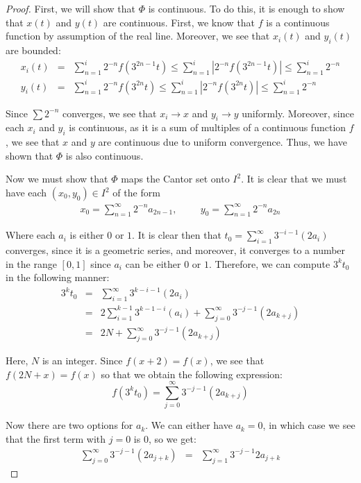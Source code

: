 \documentclass[psamsfonts]{amsart}
\theoremstyle{definition}
\theoremstyle{remark}
\numberwithin{equation}{section}
\begin{document}
\begin{proof}
First, we will show that $\Phi$ is continuous. To do this, it is enough to show that $x(t)$ and $y(t)$ are continuous. First, we know that $f$ is a continuous function by assumption of the real line. Moreover, we see that $x_i(t)$ and $y_i(t)$ are bounded:
\begin{eqnarray}
x_i(t) &=& \sum_{n=1}^i 2^{-n} f(3^{2n-1}t) \leq \sum_{n=1}^i |2^{-n} f(3^{2n-1}t)| \leq \sum_{n=1}^i 2^{-n} \\
y_i(t) &=& \sum_{n=1}^i 2^{-n} f(3^{2n}t) \leq \sum_{n=1}^i |2^{-n} f(3^{2n}t)| \leq \sum_{n=1}^i 2^{-n} 
\end{eqnarray}

Since $\sum 2^{-n}$ converges, we see that $x_i \to x$ and $y_i \to y$ uniformly. Moreover, since each $x_i$ and $y_i$ is continuous, as it is a sum of multiples of a continuous function $f$, we see that $x$ and $y$ are continuous due to uniform convergence. Thus, we have shown that $\Phi$ is also continuous.

Now we must show that $\Phi$ maps the Cantor set onto $I^2$. It is clear that we must have each $(x_0, y_0) \in I^2$ of the form 
\begin{eqnarray}
x_0 = \sum_{n=1}^\infty 2^{-n} a_{2n-1}, \hspace{1cm} y_0 = \sum_{n=1}^\infty 2^{-n} a_{2n}
\end{eqnarray}

Where each $a_i$ is either $0$ or $1$. It is clear then that $t_0 = \sum_{i=1}^\infty 3^{-i -1}(2 a_i)$ converges, since it is a geometric series, and moreover, it converges to a number in the range $[0,1]$ since $a_i$ can be either $0$ or $1$. Therefore, we can compute $3^k t_0$ in the following manner:
\begin{eqnarray}
3^k t_0 &=& \sum_{i=1}^\infty 3^{k-i-1} (2a_i) \\
&=& 2 \sum_{i=1}^{k-1} 3^{k-1 - i} (a_i) + \sum_{j=0}^\infty 3^{-j-1} (2 a_{k+j}) \\
&=& 2 N + \sum_{j=0}^\infty 3^{-j-1} (2 a_{k+j})
\end{eqnarray}

Here, $N$ is an integer. Since $f(x+2) = f(x)$, we see that $f(2N + x) = f(x)$ so that we obtain the following expression:
\begin{equation}
f(3^k t_0) = \sum_{j=0}^\infty 3^{-j-1} (2 a_{k+j})
\end{equation}

Now there are two options for $a_k$. We can either have $a_k = 0$, in which case we see that the first term with $j=0$ is $0$, so we get:
\begin{eqnarray}
\sum_{j=0}^\infty 3^{-j-1} (2 a_{j+k}) &=& \sum_{j=1}^\infty 3^{-j-1} 2 a_{j+k}
\end{eqnarray}


\end{proof}
\end{document}
